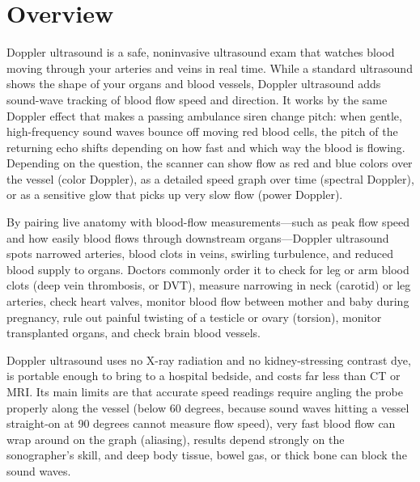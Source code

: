 \label{ch:infographic-doppler-ultrasound}

\section{Overview}

Doppler ultrasound is a safe, noninvasive ultrasound exam that watches blood moving through your arteries and veins in real time. While a standard ultrasound shows the shape of your organs and blood vessels, Doppler ultrasound adds sound-wave tracking of blood flow speed and direction. It works by the same Doppler effect that makes a passing ambulance siren change pitch: when gentle, high-frequency sound waves bounce off moving red blood cells, the pitch of the returning echo shifts depending on how fast and which way the blood is flowing. Depending on the question, the scanner can show flow as red and blue colors over the vessel (color Doppler), as a detailed speed graph over time (spectral Doppler), or as a sensitive glow that picks up very slow flow (power Doppler).

By pairing live anatomy with blood-flow measurements---such as peak flow speed and how easily blood flows through downstream organs---Doppler ultrasound spots narrowed arteries, blood clots in veins, swirling turbulence, and reduced blood supply to organs. Doctors commonly order it to check for leg or arm blood clots (deep vein thrombosis, or DVT), measure narrowing in neck (carotid) or leg arteries, check heart valves, monitor blood flow between mother and baby during pregnancy, rule out painful twisting of a testicle or ovary (torsion), monitor transplanted organs, and check brain blood vessels.

Doppler ultrasound uses no X-ray radiation and no kidney-stressing contrast dye, is portable enough to bring to a hospital bedside, and costs far less than CT or MRI. Its main limits are that accurate speed readings require angling the probe properly along the vessel (below 60 degrees, because sound waves hitting a vessel straight-on at 90 degrees cannot measure flow speed), very fast blood flow can wrap around on the graph (aliasing), results depend strongly on the sonographer's skill, and deep body tissue, bowel gas, or thick bone can block the sound waves.

